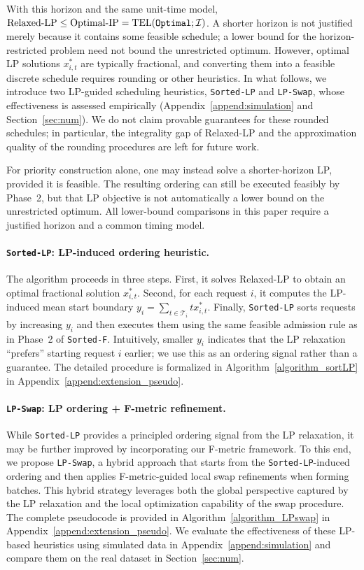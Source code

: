 \documentclass[nonblindrev]{informs3_hide}
\newcommand{\sortF}{\texttt{Sorted-F}}
\newcommand{\sortLP}{\texttt{Sorted-LP}}
\newcommand{\opt}{\texttt{Optimal}}
\newcommand{\LPSwap}{\texttt{LP-Swap}}
\begin{document}
With this horizon and the same unit-time model, $\mathrm{Relaxed\text{-}LP}\le\mathrm{Optimal\text{-}IP}=\mathrm{TEL}(\textup{\opt};\mathcal I)$. A shorter horizon is not justified merely because it contains some feasible schedule; a lower bound for the horizon-restricted problem need not bound the unrestricted optimum. However, optimal LP solutions $x_{i,t}^{*}$ are typically fractional, and converting them into a feasible discrete schedule requires rounding or other heuristics. In what follows, we introduce two LP-guided scheduling heuristics, \sortLP{} and \LPSwap{}, whose effectiveness is assessed empirically (Appendix~\ref{append:simulation} and Section~\ref{sec:num}). We do not claim provable guarantees for these rounded schedules; in particular, the integrality gap of Relaxed-LP and the approximation quality of the rounding procedures are left for future work.

For priority construction alone, one may instead solve a shorter-horizon LP, provided it is feasible. The resulting ordering can still be executed feasibly by Phase~2, but that LP objective is not automatically a lower bound on the unrestricted optimum. All lower-bound comparisons in this paper require a justified horizon and a common timing model.

\paragraph{\sortLP: LP-induced ordering heuristic.}
The algorithm proceeds in three steps. First, it solves Relaxed-LP to obtain an optimal fractional solution $x_{i,t}^{*}$. Second, for each request $i$, it computes the LP-induced mean start boundary $y_i=\sum_{t\in\mathcal T_i}t x_{i,t}^*$. Finally, \sortLP{} sorts requests by increasing $y_i$ and then executes them using the same feasible admission rule as in Phase~2 of \sortF. Intuitively, smaller $y_i$ indicates that the LP relaxation ``prefers'' starting request $i$ earlier; we use this as an ordering signal rather than a guarantee. The detailed procedure is formalized in Algorithm~\ref{algorithm_sortLP} in Appendix~\ref{append:extension_pseudo}.

\paragraph{\LPSwap: LP ordering + F-metric refinement.}
While \sortLP{} provides a principled ordering signal from the LP relaxation, it may be further improved by incorporating our F-metric framework. To this end, we propose \LPSwap, a hybrid approach that starts from the \sortLP-induced ordering and then applies F-metric-guided local swap refinements when forming batches. This hybrid strategy leverages both the global perspective captured by the LP relaxation and the local optimization capability of the swap procedure. The complete pseudocode is provided in Algorithm~\ref{algorithm_LPswap} in Appendix~\ref{append:extension_pseudo}. We evaluate the effectiveness of these LP-based heuristics using simulated data in Appendix~\ref{append:simulation} and compare them on the real dataset in Section~\ref{sec:num}.
\end{document}
